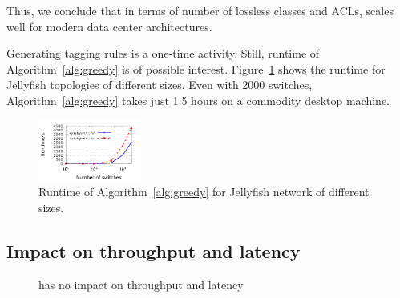 Thus, we conclude that in terms of number of lossless classes and ACLs,
\sysname{} scales well for modern data center architectures.

Generating tagging rules is a one-time activity. Still, runtime of
Algorithm~\ref{alg:greedy} is of possible interest.
Figure~\ref{fig:algo_runtime} shows the runtime for Jellyfish topologies of
different sizes. Even with 2000 switches, Algorithm~\ref{alg:greedy} takes
just 1.5 hours on a commodity desktop machine.


\begin{figure}
	\centering
	\includegraphics[width=0.3\textwidth] {figs/algo_runtime}
	\vspace{-1em}
	\caption{Runtime of Algorithm~\ref{alg:greedy} for Jellyfish network of different sizes.}
	\label{fig:algo_runtime}
	\vspace{-0.25in}
\end{figure}

\subsection{Impact on throughput and latency}\label{subsec:exp_performanceoverhead}

\begin{figure}[t]
	\centering
	
	\vspace{-1em}
		\caption{\sysname{} has no impact on throughput and latency}
		\vspace{-1em}
		\label{fig:perf_penalty}
\end{figure}

